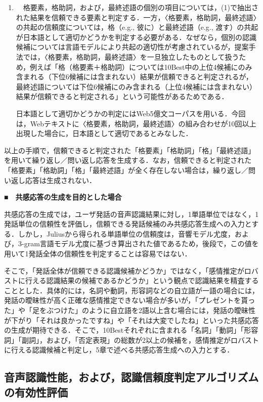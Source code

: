 \documentclass[japanese]{jnlp_1.4}
\begin{document}
\begin{enumerate}
\item 　格要素，格助詞，および，最終述語の個別の項目については，(1)で抽出された結果を信頼できる要素と判定する．一方，〈格要素，格助詞，最終述語〉の共起の信頼度については，格（e.g., 彼に）と最終述語（e.g., 渡す）の共起が日本語として適切かどうかを判定する必要がある．なぜなら，個別の認識候補については言語モデルにより共起の適切性が考慮されているが，提案手法では，〈格要素，格助詞，最終述語〉を一旦独立したものとして扱うため，例えば「格（格要素＋格助詞）については10Best中の上位4候補にのみ含まれる（下位6候補には含まれない）結果が信頼できると判定されるが，最終述語については下位6候補にのみ含まれる（上位4候補には含まれない）結果が信頼できると判定される」という可能性があるためである．

日本語として適切かどうかの判定にはWeb5億文コーパス\cite{no38}を用いる．今回は，Webテキストに〈格要素，格助詞，最終述語〉の組み合わせが10回以上出現した場合に，日本語として適切であるとみなした．
\end{enumerate}

以上の手順で，信頼できると判定された「格要素」「格助詞」「格」「最終述語」を用いて繰り返し／問い返し応答を生成する．なお，信頼できると判定された「格要素」「格助詞」「格」「最終述語」が全く存在しない場合は，繰り返し／問い返し応答は生成されない．


\noindent\textbf{■　共感応答の生成を目的とした場合}

共感応答の生成では，ユーザ発話の音声認識結果に対し，1単語単位ではなく，1発話単位の信頼性を評価し，信頼できる発話候補のみ共感応答生成への入力とする．しかし，Juliusから得られる単語単位の信頼度は，音響モデル尤度，および，3-gram言語モデル尤度に基づき算出された値であるため，後段で，この値を用いて1発話全体の信頼性を判定することは容易ではない．

そこで，「発話全体が信頼できる認識候補かどうか」ではなく，「感情推定がロバストに行える認識結果の候補であるかどうか」という観点で認識結果を精査することとした．具体的には，名詞や動詞，形容詞などの自立語が一語の場合には，発話の曖昧性が高く正確な感情推定できない場合が多いが，「プレゼントを貰った」や「足をぶつけた」のように自立語を2語以上含む場合には，発話の曖昧性が下がり「それは良かったですね」や「それは大変でしたね」といった共感応答の生成が期待できる．そこで，10Bestそれぞれに含まれる「名詞」「動詞」「形容詞」「副詞」，および，「否定表現」の総数が2以上の候補を，感情推定がロバストに行える認識候補と判定し，5章で述べる共感応答生成への入力とする．
  
  

\subsection{音声認識性能，および，認識信頼度判定アルゴリズムの有効性評価}
\end{document}
